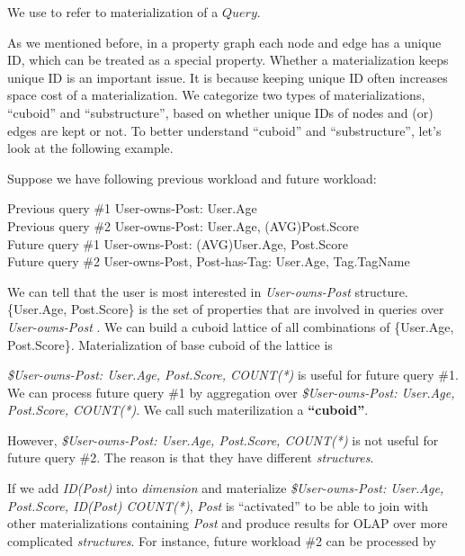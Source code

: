 We use  to refer to materialization of a $Query$.

As we mentioned before, in a property graph each node and edge has a unique ID, which can be treated as a special property. Whether a materialization keeps unique ID is an important issue. It is because keeping unique ID often increases space cost of a materialization. We categorize two types of materializations, ``cuboid'' and ``substructure'', based on whether unique IDs of nodes and (or) edges are kept or not. To better understand ``cuboid'' and ``substructure'', let's look at the following example.


Suppose we have following previous workload and future workload:

\noindent Previous query \#1 User-owns-Post: User.Age\\
Previous query \#2 User-owns-Post: User.Age, (AVG)Post.Score\\
Future query \#1 User-owns-Post: (AVG)User.Age, Post.Score	\\
Future query \#2 User-owns-Post, Post-has-Tag: User.Age, Tag.TagName




%
%

We can tell that the user is most interested in  \textit{User-owns-Post} structure. \{User.Age, Post.Score\} is the set of properties that are involved in queries over \textit{User-owns-Post} . We can build a cuboid lattice of all combinations of  \{User.Age, Post.Score\}. Materialization of base cuboid of the lattice is


\textit{\$User-owns-Post: User.Age, Post.Score, COUNT(*)} is useful for future query \#1. We can process future query \#1 by aggregation over \textit{\$User-owns-Post: User.Age, Post.Score, COUNT(*)}. We call such materilization a \textbf{``cuboid''}.


However, \textit{\$User-owns-Post: User.Age, Post.Score, COUNT(*)} is not useful for future query \#2. The reason is that they have different \textit{structures}.


If we add \textit{ID(Post)} into \textit{dimension} and materialize \textit{\$User-owns-Post: User.Age, Post.Score, ID(Post) COUNT(*)}, \textit{Post} is ``activated'' to be able to join with other materializations containing \textit{Post} and produce results for OLAP over more complicated \textit{structures}. For instance, future workload \#2 can be processed by 


